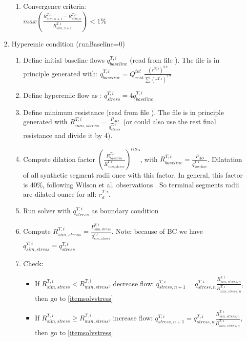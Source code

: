 \documentclass[a4paper, 11pt]{article} %
\begin{document}
\begin{enumerate}[label=(\Alph*)]
\begin{enumerate}[label={\arabic*.}]
\item Convergence criteria: \label{itemRestEnd} \\
$max\left( \frac{R_{sim,n+1}^{T,i}-R_{sim,n}^{T,i}}{R_{sim,n+1}^{T,i}} \right) < 1\%$
\end{enumerate}


\item Hyperemic condition (runBaseline=0) \label{itemStress}
\begin{enumerate}[label={\arabic*.}]
\item Define initial baseline flows $q^{T,i}_{baseline}$ (read from file ). The file is in principle generated with: $q^{T,i}_{baseline}=Q^{tot}_{rest} \frac{(r^{T,i})^{2.7}}{\sum(r^{T,i})^{2.7}}$ \label{itemStressStart}
\item Define hyperemic flow as : $q^{T,i}_{stress} = 4 q^{T,i}_{baseline}$
\item Define minimum resistance (read from file ). The file is in principle generated with $R^{T,i}_{min,stress} = \frac{P_{AO}}{q^{T,i}_{stress}}$ (or could also use the rest final resistance and divide it by 4).
\item Compute dilation factor $\left( \frac{R_{baseline}^{T,i}}{R_{min,stress}^{T,i}} \right)^{0.25}$, with $ R_{baseline}^{T,i}= \frac{P_{AO}}{q_{baseline}^{T,i}} $. Dilatation of all synthetic segment radii once with this factor. In general, this factor is 40\%, following Wilson et al. observations \cite{wilson1990effects}. So terminal segments radii are dilated ounce for all:  $r_d^{T,i}$.
\item Run solver with $q^{T,i}_{stress}$ as boundary condition \label{itemsolvstress}
\item Compute $R_{sim,stress}^{T,i}= \frac{P_{sim,stress}^{T,i}}{q_{sim,stress}^{T,i}}$. Note: because of BC we have $q_{sim,stress}^{T,i}=q_{stress}^{T,i}$
\item Check: \label{stressstepcheck}\\

\begin{itemize}
\item If $R_{sim,stress}^{T,i} < R_{min,stress}^{T,i}$, decrease flow: $q_{stress,n+1}^{T,i}=q_{stress,n}^{T,i}  \frac{R_{sim,stress,n}^{T,i}}{R_{min,stress,n}^{T,i}}$, then go to \ref{itemsolvstress}
\item If $R_{sim,stress}^{T,i} \geq R_{min,stress}^{T,i}$, increase flow: $q_{stress,n+1}^{T,i}= q_{stress,n}^{T,i} \frac{R_{sim,stress,n}^{T,i}}{R_{min,stress,n}^{T,i}}$, then go to \ref{itemsolvstress}
\end{itemize}


\end{enumerate}
\end{enumerate}
\end{document}
